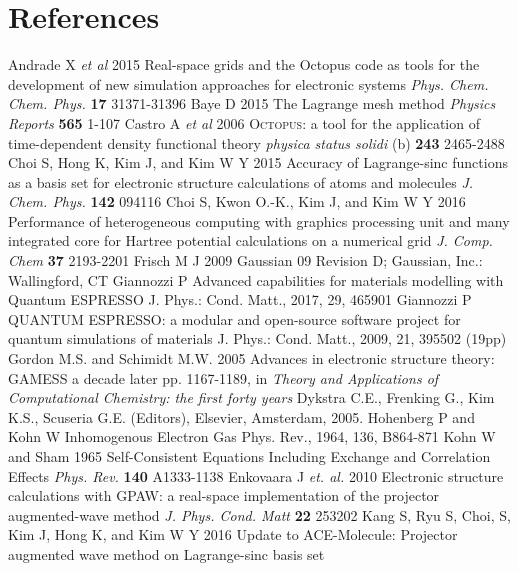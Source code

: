 \section*{References}

\begin{thebibliography}{9}%
%
 Andrade X \textit{et al} 2015
Real-space grids and the Octopus code as tools for the development
of new simulation approaches for electronic systems
\textit{Phys. Chem. Chem. Phys.} \textbf{17} 31371-31396
%
 Baye D 2015
The Lagrange mesh method
\textit{Physics Reports} \textbf{565} 1-107
%
 Castro A \textit{et al} 2006
\textsc{Octopus}: a tool for the application of time-dependent density functional theory
\textit{physica status solidi} (b) \textbf{243} 2465-2488
%
 Choi S, Hong K, Kim J, and Kim W Y 2015
Accuracy of Lagrange-sinc functions as a basis set for electronic structure
calculations of atoms and molecules
\textit{J. Chem. Phys.} \textbf{142} 094116
%
 Choi S,  Kwon O.-K., Kim J, and Kim W Y 2016
Performance of heterogeneous computing with graphics processing unit
and many integrated core for Hartree potential calculations on a numerical grid
\textit{J. Comp. Chem} \textbf{37} 2193-2201
%
 Frisch M J 2009
Gaussian 09 Revision D; Gaussian, Inc.: Wallingford, CT
%
 Giannozzi P
Advanced capabilities for materials modelling with Quantum ESPRESSO
J. Phys.: Cond. Matt., 2017, 29, 465901
%
 Giannozzi P
QUANTUM ESPRESSO: a modular and open-source software project for
quantum simulations of materials J. Phys.: Cond. Matt., 2009, 21, 395502 (19pp)
%
Gordon M.S. and Schimidt M.W. 2005
Advances in electronic structure theory: GAMESS a decade later
pp. 1167-1189, in \textit{Theory and Applications of Computational Chemistry: the first forty years}
Dykstra C.E., Frenking G., Kim K.S., Scuseria G.E. (Editors), Elsevier, Amsterdam, 2005.
%
 Hohenberg P and Kohn W
Inhomogenous Electron Gas Phys. Rev., 1964, 136, B864-871
%
 Kohn W and Sham 1965
Self-Consistent Equations Including Exchange and Correlation Effects
\textit{Phys. Rev.} \textbf{140} A1333-1138
%
 Enkovaara J \textit{et. al.} 2010
Electronic structure calculations with GPAW:
a real-space implementation of the projector augmented-wave method
\textit{J. Phys. Cond. Matt} \textbf{22} 253202
%
 Kang S, Ryu S, Choi, S, Kim J, Hong K, and Kim W Y 2016
Update to ACE-Molecule: Projector augmented wave method on Lagrange-sinc basis set

\end{thebibliography}
